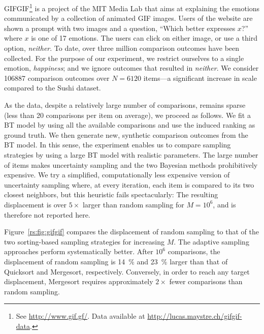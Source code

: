 GIFGIF\footnote{See \url{http://www.gif.gf/}.
Data available at \url{http://lucas.maystre.ch/gifgif-data}.} is a project of the MIT Media Lab that aims at explaining the emotions communicated by a collection of animated GIF images.
Users of the website are shown a prompt with two images and a question, ``Which better expresses $x$?'' where $x$ is one of 17 emotions.
The users can click on either image, or use a third option, \emph{neither}.
To date, over three million comparison outcomes have been collected.
For the purpose of our experiment, we restrict ourselves to a single emotion, \emph{happiness}; and we ignore outcomes that resulted in \emph{neither}.
We consider \num{106887} comparison outcomes over $N = \num{6120}$ items---a significant increase in scale compared to the Sushi dataset.

As the data, despite a relatively large number of comparisons, remains sparse (less than 20 comparisons per item on average), we proceed as follows.
We fit a BT model by using all the available comparisons and use the induced ranking as ground truth.
We then generate new, synthetic comparison outcomes from the BT model.
In this sense, the experiment enables us to compare sampling strategies by using a large BT model with realistic parameters.
The large number of items makes uncertainty sampling and the two Bayesian methods prohibitively expensive.
We try a simplified, computationally less expensive version of uncertainty sampling where, at every iteration, each item is compared to its two closest neighbors, but this heuristic fails spectacularly: The resulting displacement is over $5\times$ larger than random sampling for $M = 10^6$, and is therefore not reported here.

Figure~\ref{rs:fig:gifgif} compares the displacement of random sampling to that of the two sorting-based sampling strategies for increasing $M$.
The adaptive sampling approaches perform systematically better.
After $10^6$ comparisons, the displacement of random sampling is \num{14}~\% and \num{23}~\% larger than that of Quicksort and Mergesort, respectively.
Conversely, in order to reach any target displacement, Mergesort requires approximately $2 \times$ fewer comparisons than random sampling.
